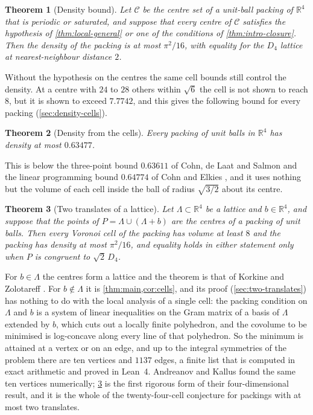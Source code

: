 \documentclass[11pt,reqno]{amsart}
\renewcommand{\_}{\origunderscore\allowbreak}
\numberwithin{equation}{section}
\theoremstyle{plain}
\newtheorem{thm}{Theorem}[section]
\theoremstyle{definition}
\theoremstyle{remark}
\begin{document}
\begin{thm}[Density bound]\label{thm:main-general}\label{cor:density-uncond}
Let $\mathcal{C}$ be the centre set of a unit-ball packing of
$\mathbb{R}^4$ that is periodic or saturated, and suppose that every centre
of $\mathcal{C}$ satisfies the hypothesis of \cref{thm:local-general} or one
of the conditions of \cref{thm:intro-closure}. Then the density of the
packing is at most $\pi^2/16$, with equality for the $D_4$ lattice at
nearest-neighbour distance $2$.
\end{thm}

Without the hypothesis on the centres the same cell bounds still control
the density. At a centre with $24$ to $28$ others within $\sqrt6$ the cell
is not shown to reach $8$, but it is shown to exceed $7.7742$, and this gives
the following bound for every packing (\cref{sec:density-cells}).

\begin{thm}[Density from the cells]\label{thm:intro-density}
Every packing of unit balls in $\mathbb{R}^4$ has density at most
$0.63477$.
\end{thm}

This is below the three-point bound $0.63611$ of Cohn, de Laat and Salmon
\cite{CdLS22} and the linear programming bound $0.64774$ of Cohn and Elkies
\cite{CE03}, and it uses nothing but the volume of each cell inside the
ball of radius $\sqrt{3/2}$ about its centre.

\begin{thm}[Two translates of a lattice]\label{thm:intro-two-translates}
Let $\Lambda\subset\mathbb{R}^4$ be a lattice and $b\in\mathbb{R}^4$, and
suppose that the points of $P=\Lambda\cup(\Lambda+b)$ are the centres of a
packing of unit balls. Then every Voronoi cell of the packing has volume at
least $8$ and the packing has density at most $\pi^2/16$, and equality holds
in either statement only when $P$ is congruent to $\sqrt2\,D_4$.
\end{thm}

For $b\in\Lambda$ the centres form a lattice and the theorem is that of
Korkine and Zolotareff \cite{KZ1872,KZ1877}. For $b\notin\Lambda$ it is
\cref{thm:main,cor:cells}, and its proof (\cref{sec:two-translates}) has
nothing to do with the local analysis of a single cell: the packing condition
on $\Lambda$ and $b$ is a system of linear inequalities on the Gram matrix of
a basis of $\Lambda$ extended by $b$, which cuts out a locally finite
polyhedron, and the covolume to be minimised is log-concave along every
line of that polyhedron. So the minimum is attained at a vertex or on an
edge, and up to the integral symmetries of the problem there are ten vertices
and $1137$ edges, a finite list that is computed in exact arithmetic and
proved in Lean~4. Andreanov and Kallus \cite{AK2020} found the same ten
vertices numerically; \cref{thm:intro-two-translates} is the first rigorous
form of their four-dimensional result, and it is the whole of the
twenty-four-cell conjecture for packings with at most two translates.
\end{document}
